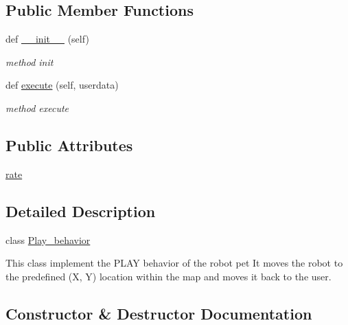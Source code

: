 \subsection*{Public Member Functions}
\begin{DoxyCompactItemize}
\item 
def \hyperlink{classbehavior__manager_1_1Play__behavior_aaa6ce2b1855d0a235e324df41d8519a1}{\+\_\+\+\_\+init\+\_\+\+\_\+} (self)
\begin{DoxyCompactList}\small\item\em method init \end{DoxyCompactList}\item 
def \hyperlink{classbehavior__manager_1_1Play__behavior_a6c5231ed8f406c82e06c741e89b0f666}{execute} (self, userdata)
\begin{DoxyCompactList}\small\item\em method execute \end{DoxyCompactList}\end{DoxyCompactItemize}
\subsection*{Public Attributes}
\begin{DoxyCompactItemize}
\item 
\hyperlink{classbehavior__manager_1_1Play__behavior_af636412228a2da30ad114266cbd121e3}{rate}
\end{DoxyCompactItemize}


\subsection{Detailed Description}
class \hyperlink{classbehavior__manager_1_1Play__behavior}{Play\+\_\+behavior} 

This class implement the P\+L\+AY behavior of the robot pet It moves the robot to the predefined (X, Y) location within the map and moves it back to the user. 

\subsection{Constructor \& Destructor Documentation}
